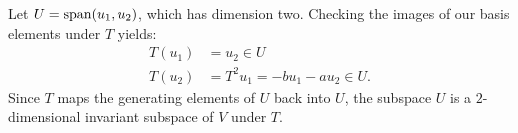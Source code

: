 \begin{exc}
\begin{solution}
\begin{enumerate}[label=\arabic*)]
  Let $U=\operatorname{span}(u_1,u_2)$, which has dimension two. Checking the images of our
  basis elements under $T$ yields:
  \begin{align*}
  T(u_1) &= u_2\in U\\
  T(u_2) &= T^2u_1=-bu_1-au_2\in U.
  \end{align*}
  Since $T$ maps the generating elements of $U$ back into $U$, the subspace
  $U$ is a $2$-dimensional invariant subspace of $V$ under $T$.
\end{enumerate}
\end{solution}
\end{exc}
